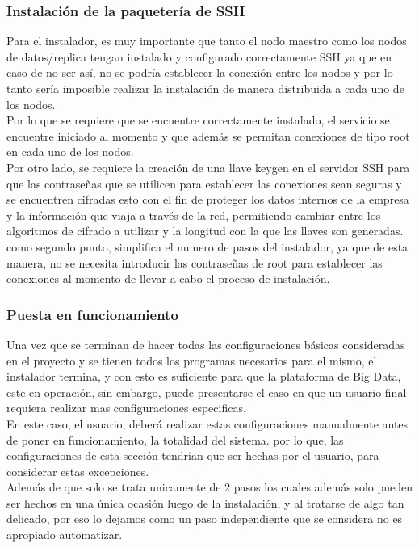 \subsubsection{Instalación de la paquetería de SSH}
Para el instalador, es muy importante que tanto el nodo maestro como los nodos de datos/replica tengan instalado y configurado correctamente SSH ya que en caso de no ser así, no se podría establecer la conexión entre los nodos y por lo tanto sería imposible realizar la instalación de manera distribuida a cada uno de los nodos.
\\
Por lo que se requiere que se encuentre correctamente instalado, el servicio se encuentre iniciado al momento y que además se permitan conexiones de tipo root en cada uno de los nodos.
\\
Por otro lado, se requiere la creación de una llave keygen en el servidor SSH para que las contraseñas que se utilicen para establecer las conexiones sean seguras y se encuentren cifradas esto con el fin de proteger los datos internos de la empresa y la información que viaja a través de la red, permitiendo cambiar entre los algoritmos de cifrado a utilizar y la longitud con la que las llaves son generadas.
\\
como segundo punto, simplifica el numero de pasos del instalador, ya que de esta manera, no se necesita introducir las contraseñas de root para establecer las conexiones al momento de llevar a cabo el proceso de instalación. 
\\
\subsubsection{Puesta en funcionamiento}
Una vez que se terminan de hacer todas las configuraciones básicas consideradas en el proyecto y se tienen todos los programas necesarios para el mismo, el instalador termina, y con esto es suficiente para que la plataforma de Big Data, este en operación, sin embargo, puede presentarse el caso en que un usuario final requiera realizar mas configuraciones especificas.\\
En este caso, el usuario, deberá realizar estas configuraciones manualmente antes de poner en funcionamiento, la totalidad del sistema. por lo que, las configuraciones de esta sección tendrían que ser hechas por el usuario, para considerar estas excepciones.\\
Además de que solo se trata unicamente de 2 pasos los cuales además solo pueden ser hechos en una única ocasión luego de la instalación, y al tratarse de algo tan delicado, por eso lo dejamos como un paso independiente que se considera no es apropiado automatizar.
\\
